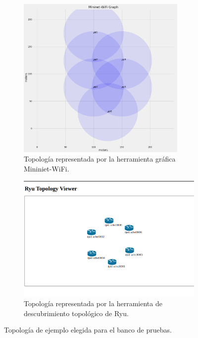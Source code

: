 \begin{figure}[ht!]
  \centering
  \begin{subfigure}{.49\textwidth}
    \centering
    \includegraphics[width=0.9\textwidth]{fig/04_in-band/in_band_8.png}
    \caption{Topología representada por la herramienta gráfica Mininiet-WiFi.}
    \label{fig:subfiguraA}
  \end{subfigure}
  \begin{subfigure}{.49\textwidth}
    \centering
    \includegraphics[width=\textwidth]{fig/04_in-band/in_band_9.png}
    \caption{Topología representada por la herramienta de descubrimiento topológico de Ryu.}
    \label{fig:subfiguraB}
  \end{subfigure}
  \caption{Topología de ejemplo elegida para el banco de pruebas.}
  \label{fig:figuraCompleta}
\end{figure}

